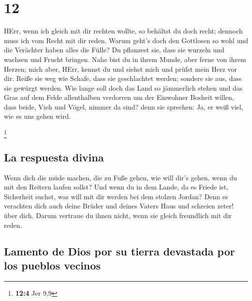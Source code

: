 \hypertarget{section-11}{%
\section{12}\label{section-11}}

 HErr, wenn ich gleich mit dir rechten wollte, so behältst
du doch recht; dennoch muss ich vom Recht mit dir reden. Warum geht's
doch den Gottlosen so wohl und die Verächter haben alles die Fülle?
 Du pflanzest sie, dass sie wurzeln und wachsen und Frucht
bringen. Nahe bist du in ihrem Munde, aber ferne von ihrem Herzen;
 mich aber, HErr, kennst du und siehst mich und prüfst
mein Herz vor dir. Reiße sie weg wie Schafe, dass sie geschlachtet
werden; sondere sie aus, dass sie gewürgt werden.  Wie
lange soll doch das Land so jämmerlich stehen und das Gras auf dem Felde
allenthalben verdorren um der Einwohner Bosheit willen, dass beide, Vieh
und Vögel, nimmer da sind? denn sie sprechen: Ja, er weiß viel, wie es
uns gehen wird.

\footnote{\textbf{12:4} Jer 9,9}

\hypertarget{la-respuesta-divina}{%
\subsection{La respuesta divina}\label{la-respuesta-divina}}

 Wenn dich die müde machen, die zu Fuße gehen, wie will
dir's gehen, wenn du mit den Reitern laufen sollst? Und wenn du in dem
Lande, da es Friede ist, Sicherheit suchst, was will mit dir werden bei
dem stolzen Jordan?  Denn es verachten dich auch deine
Brüder und deines Vaters Haus und schreien zeter! über dich. Darum
vertraue du ihnen nicht, wenn sie gleich freundlich mit dir reden.

\hypertarget{lamento-de-dios-por-su-tierra-devastada-por-los-pueblos-vecinos}{%
\subsection{Lamento de Dios por su tierra devastada por los pueblos
vecinos}\label{lamento-de-dios-por-su-tierra-devastada-por-los-pueblos-vecinos}}

